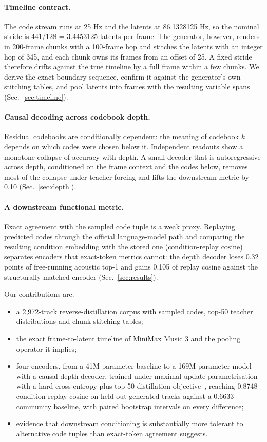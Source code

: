\paragraph{Timeline contract.} The code stream runs at 25 Hz and the latents at 86.1328125 Hz, so the nominal stride is 441/128 = 3.4453125 latents per frame. The generator, however, renders in 200-frame chunks with a 100-frame hop and stitches the latents with an integer hop of 345, and each chunk owns its frames from an offset of 25. A fixed stride therefore drifts against the true timeline by a full frame within a few chunks. We derive the exact boundary sequence, confirm it against the generator's own stitching tables, and pool latents into frames with the resulting variable spans (Sec.~\ref{sec:timeline}).

\paragraph{Causal decoding across codebook depth.} Residual codebooks are conditionally dependent: the meaning of codebook $k$ depends on which codes were chosen below it. Independent readouts show a monotone collapse of accuracy with depth. A small decoder that is autoregressive across depth, conditioned on the frame context and the codes below, removes most of the collapse under teacher forcing and lifts the downstream metric by 0.10 (Sec.~\ref{sec:depth}).

\paragraph{A downstream functional metric.} Exact agreement with the sampled code tuple is a weak proxy. Replaying predicted codes through the official language-model path and comparing the resulting condition embedding with the stored one (condition-replay cosine) separates encoders that exact-token metrics cannot: the depth decoder loses 0.32 points of free-running acoustic top-1 and gains 0.105 of replay cosine against the structurally matched encoder (Sec.~\ref{sec:results}).

Our contributions are:
\begin{itemize}
  \setlength{\itemsep}{1pt}
  \item a 2,972-track reverse-distillation corpus with sampled codes, top-50 teacher distributions and chunk stitching tables;
  \item the exact frame-to-latent timeline of MiniMax Music 3 and the pooling operator it implies;
  \item four encoders, from a 41M-parameter baseline to a 169M-parameter model with a causal depth decoder, trained under maximal update parametrisation~\cite{yang2022mup} with a hard cross-entropy plus top-50 distillation objective~\cite{hinton2015distill}, reaching 0.8748 condition-replay cosine on held-out generated tracks against a 0.6633 community baseline, with paired bootstrap intervals on every difference;
  \item evidence that downstream conditioning is substantially more tolerant to alternative code tuples than exact-token agreement suggests.
\end{itemize}
